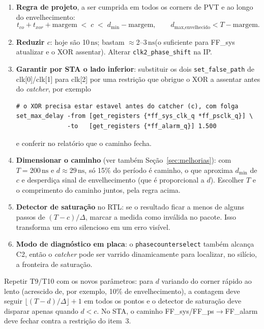 \documentclass[11pt,a4paper]{article}
\newcommand{\campo}[1]{\vspace{5pt}\noindent{\bfseries\color{lescgray}#1}\par\vspace{1pt}}
\newcommand{\ns}{\ensuremath{\,\mathrm{ns}}\xspace}
\begin{document}
\campo{Como corrigir}
\begin{enumerate}
  \item \textbf{Regra de projeto}, a ser cumprida em todos os corners de PVT e ao longo do
        envelhecimento:
        \[
          t_{co} + t_{xor} + \text{margem} \;<\; c \;<\; d_\text{min} - \text{margem},
          \qquad d_\text{max,envelhecido} < T - \text{margem}.
        \]
  \item \textbf{Reduzir $c$}: hoje são 10\ns; bastam $\approx$2--3\ns (o suficiente para
        FF\_sys atualizar e o XOR assentar). Alterar \texttt{clk2\_phase\_shift} na IP.
  \item \textbf{Garantir por STA o lado inferior}: substituir os dois \texttt{set\_false\_path}
        de clk[0]/clk[1] para clk[2] por uma restrição que obrigue o XOR a assentar antes do
        \emph{catcher}, por exemplo
\begin{lstlisting}[style=sh]
# o XOR precisa estar estavel antes do catcher (c), com folga
set_max_delay -from [get_registers {*ff_sys_clk_q *ff_psclk_q}] \
              -to   [get_registers {*ff_alarm_q}] 1.500
\end{lstlisting}
        e conferir no relatório que o caminho fecha.
  \item \textbf{Dimensionar o caminho} (ver também Seção~\ref{sec:melhorias}): com
        $T = 200\ns$ e $d \approx 29\ns$, só 15\% do período é caminho, o que aproxima $d_\text{min}$
        de $c$ e desperdiça sinal de envelhecimento (que é proporcional a $d$). Escolher $T$ e o
        comprimento do caminho juntos, pela regra acima.
  \item \textbf{Detector de saturação} no RTL: se o resultado ficar a menos de alguns passos de
        $(T-c)/\Delta$, marcar a medida como inválida no pacote. Isso transforma um erro
        silencioso em um erro visível.
  \item \textbf{Modo de diagnóstico em placa}: o \texttt{phasecounterselect} também alcança
        C2, então o \emph{catcher} pode ser varrido dinamicamente para localizar, no silício, a
        fronteira de saturação.
\end{enumerate}

\campo{Como verificar}
Repetir T9/T10 com os novos parâmetros: para $d$ variando do corner rápido ao lento
(acrescido de, por exemplo, 10\% de envelhecimento), a contagem deve seguir
$\lfloor (T-d)/\Delta\rfloor + 1$ em todos os pontos e o detector de saturação deve disparar apenas
quando $d < c$. No STA, o caminho FF\_sys/FF\_ps$\rightarrow$FF\_alarm deve fechar contra a
restrição do item~3.
\end{document}
